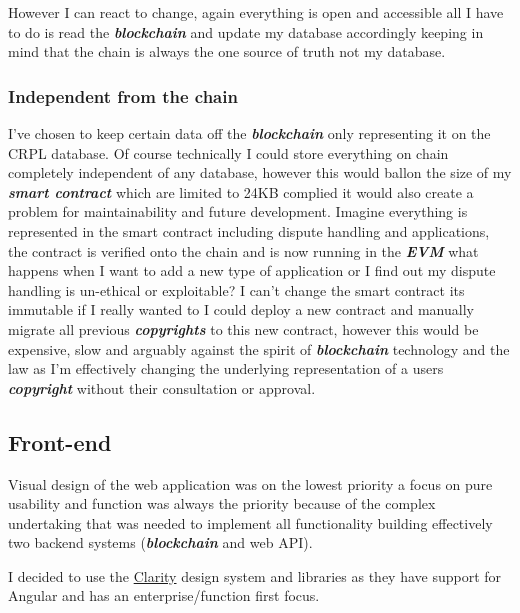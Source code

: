\documentclass[12pt]{article}
\newcommand{\keyword}[1]{\textbf{\textit{#1}}}
\begin{document}
However I can react to change, again everything is open and accessible all I have to do is read the \keyword{blockchain} and update my database accordingly keeping in mind that the chain is always the one source of truth not my database.

\subsubsection{Independent from the chain}

I've chosen to keep certain data off the \keyword{blockchain} only representing it on the CRPL database. Of course technically I could store everything on chain completely independent of any database, however this would ballon the size of my \keyword{smart contract} which are limited to 24KB complied it would also create a problem for maintainability and future development. 
Imagine everything is represented in the smart contract including dispute handling and applications, the contract is verified onto the chain and is now running in the \keyword{EVM} what happens when I want to add a new type of application or I find out my dispute handling is un-ethical or exploitable? I can't change the smart contract its immutable if I really wanted to I could deploy a new contract and manually migrate all previous \keyword{copyrights} to this new contract, however this would be expensive, slow and arguably against the spirit of \keyword{blockchain} technology and the law as I'm effectively changing the underlying representation of a users \keyword{copyright} without their consultation or approval.

\subsection{Front-end}

Visual design of the web application was on the lowest priority a focus on pure usability and function was always the priority because of the complex undertaking that was needed to implement all functionality building effectively two backend systems (\keyword{blockchain} and web API).

I decided to use the \href{https://clarity.design/}{Clarity} design system and libraries as they have support for Angular and has an enterprise/function first focus.
\end{document}
